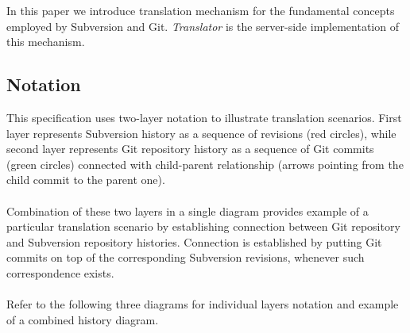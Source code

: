 \renewcommand{\figurename}{Diagram}
In this paper we introduce translation mechanism for the fundamental concepts employed by Subversion and Git.
\emph{Translator} is the server-side implementation of this mechanism.
\subsection{Notation}
This specification uses two-layer notation to illustrate translation scenarios. First layer represents 
Subversion history as a sequence of revisions (red circles), while second layer represents Git repository history 
as a sequence of Git commits (green circles) connected with child-parent relationship (arrows pointing from the child 
commit to the parent one). 
\\\\
Combination of these two layers in a single diagram provides example of a particular translation scenario by
establishing connection between Git repository and Subversion repository histories. Connection is established
by putting Git commits on top of the corresponding Subversion revisions, whenever such correspondence exists.
\\\\
Refer to the following three diagrams for individual layers notation and example of a combined history diagram.
